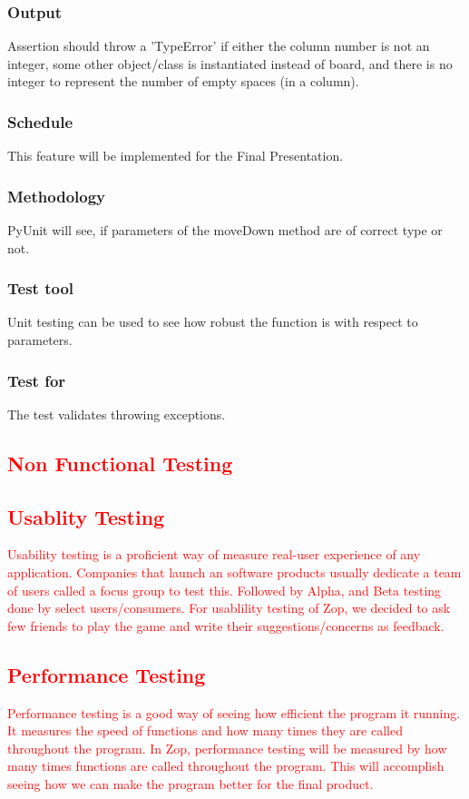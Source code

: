 \documentclass[12pt]{article}
\begin{document}
\subsubsection{Output}
Assertion should throw a 'TypeError' if either the column number is not an integer, some other object/class is instantiated instead of board, and there is no integer to represent the number of empty spaces (in a column).
\subsubsection{Schedule}
This feature will be implemented for the Final Presentation.
\subsubsection{Methodology}
PyUnit will see, if parameters of the moveDown method are of correct type or not. 
\subsubsection{Test tool}
Unit testing can be used to see how robust the function is with respect to parameters.
\subsubsection{Test for}
The test validates throwing exceptions.

\textcolor{red}{\section{Non Functional Testing}
\subsection{Usablity Testing}
Usability testing is a proficient way of measure real-user experience of any application. Companies that launch an software products usually dedicate a team of users called a focus group to test this. Followed by Alpha, and Beta testing done by select users/consumers. For usablility testing of Zop, we decided to ask few friends to play the game and write their suggestions/concerns as feedback.
\subsection{Performance Testing}
Performance testing is a good way of seeing how efficient the program it running.  It measures the speed of functions and how many times they are called throughout the program.  In Zop, performance testing will be measured by how many times functions are called throughout the program.  This will accomplish seeing how we can make the program better for the final product.}
\end{document}
